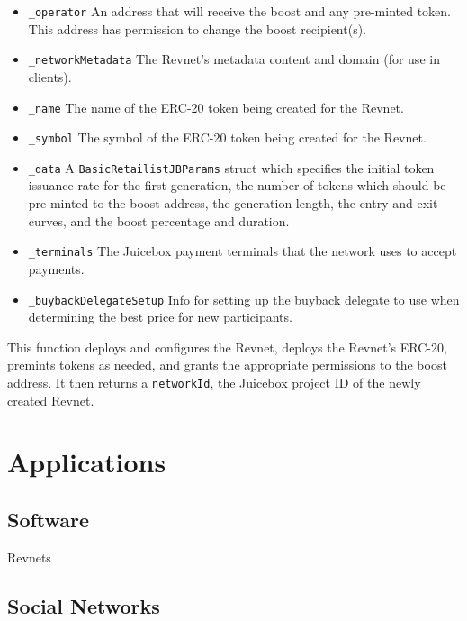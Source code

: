 \documentclass{article}
\begin{document}
\begin{itemize}
  \item \texttt{\_operator} An address that will receive the boost and any pre-minted token. This address has permission to change the boost recipient(s).
  \item \texttt{\_networkMetadata} The Revnet's metadata content and domain (for use in clients).
  \item \texttt{\_name} The name of the ERC-20 token being created for the Revnet.
  \item \texttt{\_symbol} The symbol of the ERC-20 token being created for the Revnet.
  \item \texttt{\_data} A \texttt{BasicRetailistJBParams} struct which specifies the initial token issuance rate for the first generation, the number of tokens which should be pre-minted to the boost address, the generation length, the entry and exit curves, and the boost percentage and duration.
  \item \texttt{\_terminals} The Juicebox payment terminals that the network uses to accept payments.
  \item \texttt{\_buybackDelegateSetup} Info for setting up the buyback delegate to use when determining the best price for new participants.
\end{itemize}

This function deploys and configures the Revnet, deploys the Revnet's ERC-20, premints tokens as needed, and grants the appropriate permissions to the boost address. It then returns a \texttt{networkId}, the Juicebox project ID of the newly created Revnet.

\section{Applications}


\subsection{}

\subsection{Software}

Revnets 

\subsection{Social Networks}
\end{document}
